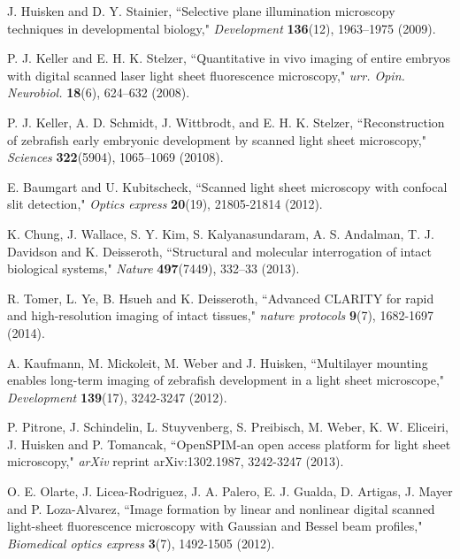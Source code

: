 \documentclass[12pt]{spieman}  %
\begin{document}
\begin{thebibliography}{0}

 J. Huisken and D. Y. Stainier, ``Selective plane illumination microscopy techniques in developmental biology," \emph{Development} \textbf{136}(12), 1963–1975 (2009).

 P. J. Keller and E. H. K. Stelzer, ``Quantitative in vivo imaging of entire embryos with digital scanned laser light sheet fluorescence microscopy," \emph{urr. Opin. Neurobiol.} \textbf{18}(6), 624–632 (2008).

 P. J. Keller, A. D. Schmidt, J. Wittbrodt, and E. H. K. Stelzer, ``Reconstruction of zebrafish early embryonic development by scanned light sheet microscopy," \emph{Sciences} \textbf{322}(5904), 1065–1069 (20108).

 E. Baumgart and U. Kubitscheck, ``Scanned light sheet microscopy with confocal slit detection," \emph{Optics express} \textbf{20}(19), 21805-21814 (2012).

 K. Chung, J. Wallace, S. Y. Kim, S. Kalyanasundaram, A. S. Andalman, T. J. Davidson and K. Deisseroth, ``Structural and molecular interrogation of intact biological systems," \emph{Nature} \textbf{497}(7449), 332–33 (2013).

 R. Tomer, L. Ye, B. Hsueh and K. Deisseroth, ``Advanced CLARITY for rapid and high-resolution imaging of intact tissues," \emph{nature protocols} \textbf{9}(7), 1682-1697 (2014).

 A. Kaufmann, M. Mickoleit, M. Weber and J. Huisken, ``Multilayer mounting enables long-term imaging of zebrafish development in a light sheet microscope," \emph{Development} \textbf{139}(17), 3242-3247 (2012).

 P. Pitrone, J. Schindelin, L. Stuyvenberg, S. Preibisch, M. Weber, K. W. Eliceiri, J. Huisken and P. Tomancak, ``OpenSPIM-an open access platform for light sheet microscopy," \emph{arXiv} reprint arXiv:1302.1987, 3242-3247 (2013).

 O. E. Olarte, J. Licea-Rodriguez, J. A. Palero, E. J. Gualda, D. Artigas, J. Mayer and P. Loza-Alvarez, ``Image formation by linear and nonlinear digital scanned light-sheet fluorescence microscopy with Gaussian and Bessel beam profiles," \emph{Biomedical optics express} \textbf{3}(7), 1492-1505 (2012).


\end{thebibliography}
\end{document}
